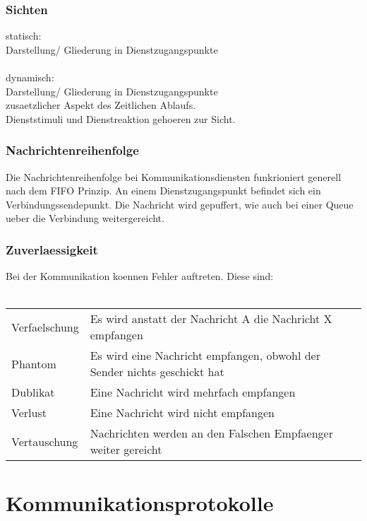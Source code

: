 \documentclass{article}
\newcommand{\tab}{\null \qquad}
\begin{document}
\subsubsection{Sichten}
statisch:\\
\tab Darstellung/ Gliederung in Dienstzugangspunkte\\
\\
dynamisch:\\
\tab Darstellung/ Gliederung in Dienstzugangspunkte\\
\tab zusaetzlicher Aspekt des Zeitlichen Ablaufs.\\
\tab \tab Dienststimuli und Dienstreaktion gehoeren zur Sicht.\\
\subsubsection{Nachrichtenreihenfolge}
Die Nachrichtenreihenfolge bei Kommunikationsdiensten funkrioniert generell nach dem FIFO Prinzip.
An einem Dienstzugangspunkt befindet sich ein Verbindungssendepunkt. Die Nachricht wird gepuffert,
wie auch bei einer Queue ueber die Verbindung weitergereicht.\\
\subsubsection{Zuverlaessigkeit}
Bei der Kommunikation koennen Fehler auftreten. Diese sind:\\
\\
\begin{tabular}{l|l}
    Verfaelschung&  Es wird anstatt der Nachricht A die Nachricht X empfangen\\
    Phantom&        Es wird eine Nachricht empfangen, obwohl der Sender nichts geschickt hat\\
    Dublikat&       Eine Nachricht wird mehrfach empfangen\\
    Verlust&        Eine Nachricht wird nicht empfangen\\
    Vertauschung&   Nachrichten werden an den Falschen Empfaenger weiter gereicht\\
\end{tabular}
\section{Kommunikationsprotokolle}
\end{document}
